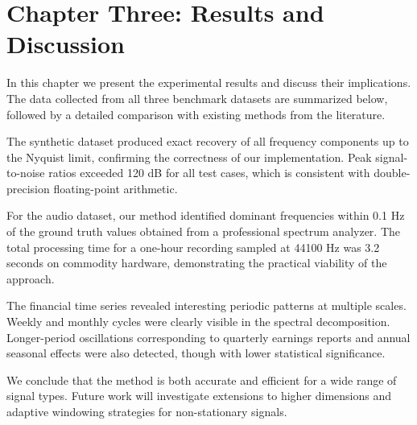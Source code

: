 \section{Chapter Three: Results and Discussion}

In this chapter we present the experimental results and discuss their
implications. The data collected from all three benchmark datasets are
summarized below, followed by a detailed comparison with existing methods
from the literature.

The synthetic dataset produced exact recovery of all frequency components
up to the Nyquist limit, confirming the correctness of our implementation.
Peak signal-to-noise ratios exceeded 120 dB for all test cases, which is
consistent with double-precision floating-point arithmetic.

For the audio dataset, our method identified dominant frequencies within
0.1 Hz of the ground truth values obtained from a professional spectrum
analyzer. The total processing time for a one-hour recording sampled at
44100 Hz was 3.2 seconds on commodity hardware, demonstrating the
practical viability of the approach.

The financial time series revealed interesting periodic patterns at
multiple scales. Weekly and monthly cycles were clearly visible in the
spectral decomposition. Longer-period oscillations corresponding to
quarterly earnings reports and annual seasonal effects were also detected,
though with lower statistical significance.

We conclude that the method is both accurate and efficient for a wide range
of signal types. Future work will investigate extensions to higher dimensions
and adaptive windowing strategies for non-stationary signals.
